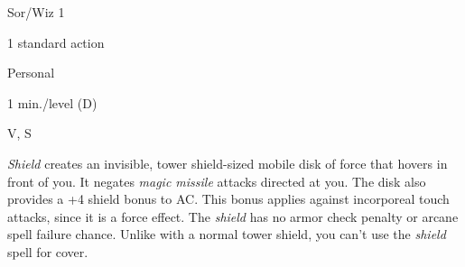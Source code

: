 
\begin{description*}
\item[Level:] Sor/Wiz 1
\item[Casting Time:] 1 standard action
\item[Range:] Personal
\item[Duration:] 1 min./level (D)
\item[Components:] V, S
\end{description*}

\textit{Shield} creates an invisible, tower shield-sized mobile disk of force that
hovers in front of you. It negates \textit{magic missile} attacks directed at you.
The disk also provides a +4 shield bonus to AC. This bonus applies against incorporeal
touch attacks, since it is a force effect. The \textit{shield} has no armor check
penalty or arcane spell failure chance. Unlike with a normal tower shield, you
can't use the \textit{shield} spell for cover.
